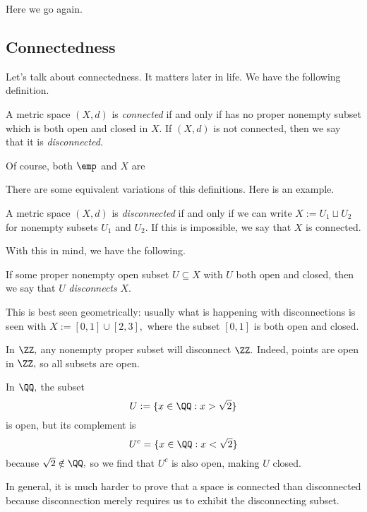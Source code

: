 \documentclass[../notes.tex]{subfiles}
\begin{document}














Here we go again.

\subsection{Connectedness}
Let's talk about connectedness. It matters later in life. We have the following definition.
\begin{definition}[Connected, I]
	A metric space $(X,d)$ is \textit{connected} if and only if has no proper nonempty subset which is both open and closed in $X.$ If $(X,d)$ is not connected, then we say that it is \textit{disconnected}.
\end{definition}
\begin{remark}
	Of course, both $\emp$ and $X$ are 
\end{remark}
There are some equivalent variations of this definitions. Here is an example.
\begin{definition}[Connected, II]
	A metric space $(X,d)$ is \textit{disconnected} if and only if we can write $X:=U_1\sqcup U_2$ for nonempty subsets $U_1$ and $U_2.$ If this is impossible, we say that $X$ is connected.
\end{definition}
With this in mind, we have the following.
\begin{definition}
	If some proper nonempty open subset $U\subseteq X$ with $U$ both open and closed, then we say that $U$ \textit{disconnects} $X.$
\end{definition}
\begin{remark}
	This is best seen geometrically: usually what is happening with disconnections is seen with $X:=[0,1]\cup[2,3],$ where the subset $[0,1]$ is both open and closed.
\end{remark}
\begin{example}
	In $\ZZ,$ any nonempty proper subset will disconnect $\ZZ.$ Indeed, points are open in $\ZZ,$ so all subsets are open.
\end{example}
\begin{example}
	In $\QQ,$ the subset
	\[U:=\{x\in\QQ:x>\sqrt2\}\]
	is open, but its complement is
	\[U^c=\{x\in\QQ:x<\sqrt2\}\]
	because $\sqrt2\notin\QQ,$ so we find that $U^c$ is also open, making $U$ closed.
\end{example}
In general, it is much harder to prove that a space is connected than disconnected because disconnection merely requires us to exhibit the disconnecting subset.
\end{document}
